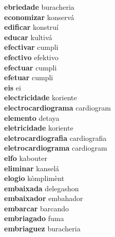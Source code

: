 \textbf{ebriedade } buracheria \\
\textbf{economizar } konservá \\
\textbf{edificar } konstruí \\
\textbf{educar } kultivá \\
\textbf{efectivar } cumpli \\
\textbf{efectivo } efektivo \\
\textbf{efectuar } cumpli \\
\textbf{efetuar } cumpli \\
\textbf{eis } ei \\
\textbf{electricidade } koriente \\
\textbf{electrocardiograma } cardiogram \\
\textbf{elemento } detaya \\
\textbf{eletricidade } koriente \\
\textbf{eletrocardiografia } cardiografia \\
\textbf{eletrocardiograma } cardiogram \\
\textbf{elfo } kabouter \\
\textbf{eliminar } kanselá \\
\textbf{elogio } kòmplimènt \\
\textbf{embaixada } delegashon \\
\textbf{embaixador } embahador \\
\textbf{embarcar } barcando \\
\textbf{embriagado } fuma \\
\textbf{embriaguez } buracheria \\
